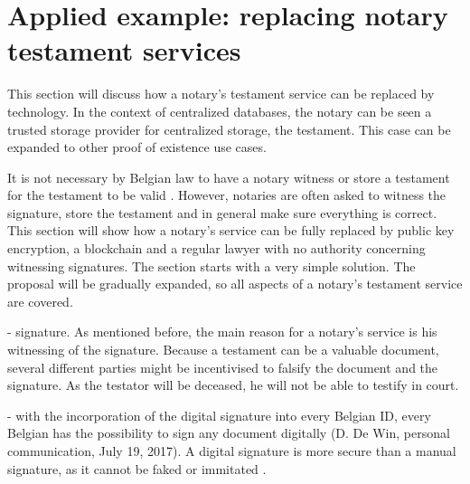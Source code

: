 \section{Applied example: replacing notary testament services}
\label{notary-will}

\iffalse
- this section will discuss the role of a notary in writing a testament and how this can be replaced by technology. The notary can be seen a trusted storage provider for centralized storage, the testament.

- It is not necessary by Belgian law to have a notary witness or store a testament \cite{eigen-testament}. However, they are still often used to witness the signature, store the testament and in general make sure everything is correct. This section will show a notary's service can be fully replaced by public key encryption, a blockchain and a regular lawyer, as the main difference between a regular lawyer and a notary is a notary's ability to witness a signature. The section starts with a very simple solution, but will gradually expand the proposal to make sure that by the end all aspects of a notary's testament service is covered.
\fi

This section will discuss how a notary's testament service can be replaced by technology. In the context of centralized databases, the notary can be seen a trusted storage provider for centralized storage, the testament. This case can be expanded to other proof of existence use cases.

It is not necessary by Belgian law to have a notary witness or store a testament for the testament to be valid \cite{eigen-testament}. However, notaries are often asked to witness the signature, store the testament and in general make sure everything is correct. This section will show how a notary's service can be fully replaced by public key encryption, a blockchain and a regular lawyer with no authority concerning witnessing signatures. The section starts with a very simple solution. The proposal will be gradually expanded, so all aspects of a notary's testament service are covered.

\iffalse
- signature. As mentioned before, the main reason for a notary's service is his witnessing of the signature. Because a testament can be a valuable document, several different parties might be incentivised to falsify the document and the signature. As the testator will be deceased, he will not be able to testify in court. 

- with the incorporation of the digital signature into every Belgian ID, every Belgian has the possibility to sign any document digitally (D. De Win, personal communication, July 19, 2017). A digital signature is more secure than a manual signature, as it cannot be faked or immitated \cite{belgian-eid}.

